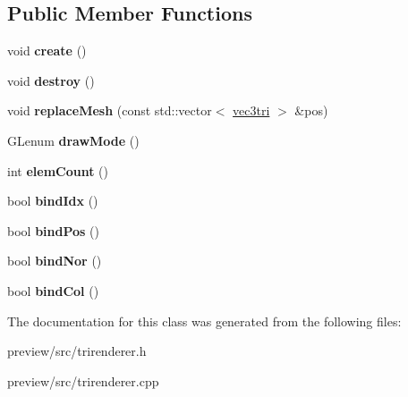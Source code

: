\subsection*{Public Member Functions}
\begin{DoxyCompactItemize}
\item 
\hypertarget{class_tri_renderer_a8c41a491f72487c146a25cd9b239ede5}{}void {\bfseries create} ()\label{class_tri_renderer_a8c41a491f72487c146a25cd9b239ede5}

\item 
\hypertarget{class_tri_renderer_a07cc288b5d04572f1f784b14ce7f3c17}{}void {\bfseries destroy} ()\label{class_tri_renderer_a07cc288b5d04572f1f784b14ce7f3c17}

\item 
\hypertarget{class_tri_renderer_a1e77e021d03ee3c3704e7c1934a54619}{}void {\bfseries replace\+Mesh} (const std\+::vector$<$ \hyperlink{structvec3tri}{vec3tri} $>$ \&pos)\label{class_tri_renderer_a1e77e021d03ee3c3704e7c1934a54619}

\item 
\hypertarget{class_tri_renderer_a9eecf387616bc70eeb24f0b56cc0564e}{}G\+Lenum {\bfseries draw\+Mode} ()\label{class_tri_renderer_a9eecf387616bc70eeb24f0b56cc0564e}

\item 
\hypertarget{class_tri_renderer_a82d0b59bb47be528c49bf13cdfe6a02e}{}int {\bfseries elem\+Count} ()\label{class_tri_renderer_a82d0b59bb47be528c49bf13cdfe6a02e}

\item 
\hypertarget{class_tri_renderer_ae42558e906dca14cc6a2c3af0186a8a2}{}bool {\bfseries bind\+Idx} ()\label{class_tri_renderer_ae42558e906dca14cc6a2c3af0186a8a2}

\item 
\hypertarget{class_tri_renderer_a1dc7908d880dd63e1ff8121865b8f74d}{}bool {\bfseries bind\+Pos} ()\label{class_tri_renderer_a1dc7908d880dd63e1ff8121865b8f74d}

\item 
\hypertarget{class_tri_renderer_ac0a43cd55c2a5a96762b751fa10cac91}{}bool {\bfseries bind\+Nor} ()\label{class_tri_renderer_ac0a43cd55c2a5a96762b751fa10cac91}

\item 
\hypertarget{class_tri_renderer_a1f74aaf83576b14d1812e04b8d60ec97}{}bool {\bfseries bind\+Col} ()\label{class_tri_renderer_a1f74aaf83576b14d1812e04b8d60ec97}

\end{DoxyCompactItemize}


The documentation for this class was generated from the following files\+:\begin{DoxyCompactItemize}
\item 
preview/src/trirenderer.\+h\item 
preview/src/trirenderer.\+cpp\end{DoxyCompactItemize}
